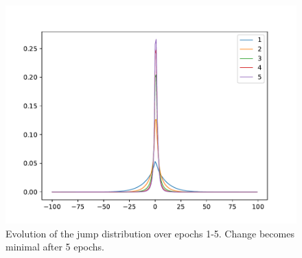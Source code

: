 \documentclass[11pt,a4paper]{article}
\begin{document}
\begin{figure}
\includegraphics[width=\linewidth]{images/epoch-jump-plot.pdf}
\caption{Evolution of the jump distribution over epochs 1-5. Change becomes minimal after 5 epochs.}
\label{fig:jump-plot}
\end{figure}
\end{document}
